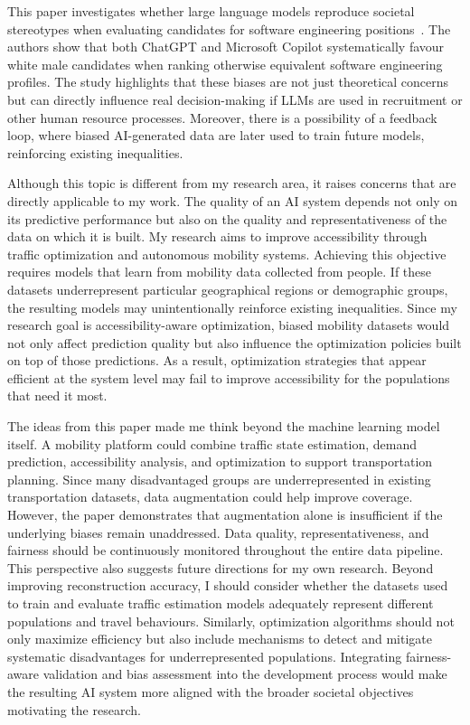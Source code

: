 \documentclass{article}
\begin{document}
This paper investigates whether large language models reproduce societal stereotypes when evaluating candidates for software engineering positions~\cite{Bano2025}. 
The authors show that both ChatGPT and Microsoft Copilot systematically favour white male candidates when ranking otherwise equivalent software engineering profiles. 
The study highlights that these biases are not just theoretical concerns but can directly influence real decision-making if LLMs are used in recruitment or other human resource processes. 
Moreover, there is a possibility of a feedback loop, where biased AI-generated data are later used to train future models, reinforcing existing inequalities.

Although this topic is different from my research area, it raises concerns that are directly applicable to my work. 
The quality of an AI system depends not only on its predictive performance but also on the quality and representativeness of the data on which it is built. 
My research aims to improve accessibility through traffic optimization and autonomous mobility systems. 
Achieving this objective requires models that learn from mobility data collected from people. 
If these datasets underrepresent particular geographical regions or demographic groups, the resulting models may unintentionally reinforce existing inequalities. 
Since my research goal is accessibility-aware optimization, biased mobility datasets would not only affect prediction quality but also influence the optimization policies built on top of those predictions. 
As a result, optimization strategies that appear efficient at the system level may fail to improve accessibility for the populations that need it most. 

The ideas from this paper made me think beyond the machine learning model itself. 
A mobility platform could combine traffic state estimation, demand prediction, accessibility analysis, and optimization to support transportation planning.
Since many disadvantaged groups are underrepresented in existing transportation datasets, data augmentation could help improve coverage. 
However, the paper demonstrates that augmentation alone is insufficient if the underlying biases remain unaddressed. 
Data quality, representativeness, and fairness should be continuously monitored throughout the entire data pipeline.
This perspective also suggests future directions for my own research. 
Beyond improving reconstruction accuracy, I should consider whether the datasets used to train and evaluate traffic estimation models adequately represent different populations and travel behaviours. 
Similarly, optimization algorithms should not only maximize efficiency but also include mechanisms to detect and mitigate systematic disadvantages for underrepresented populations. 
Integrating fairness-aware validation and bias assessment into the development process would make the resulting AI system more aligned with the broader societal objectives motivating the research.
\end{document}
